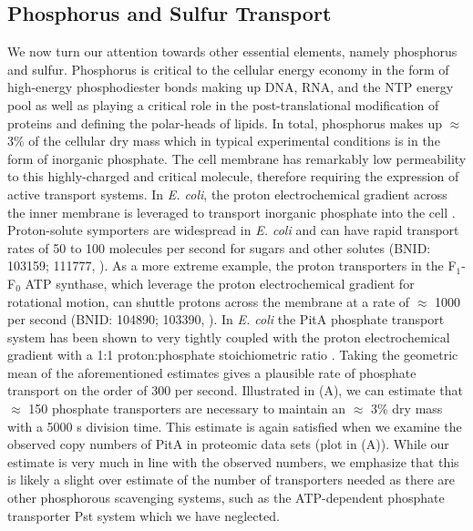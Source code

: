 \subsection{Phosphorus and Sulfur Transport}
We now turn our attention towards other essential elements, namely phosphorus and
sulfur. Phosphorus is critical to the cellular energy economy in the form of
high-energy phosphodiester bonds making up DNA, RNA, and the NTP energy pool as
well as playing a critical role in the post-translational modification of
proteins and defining the polar-heads of lipids. In total, phosphorus
makes up $\approx$3\% of the cellular dry mass which in typical experimental conditions is in the form of inorganic phosphate. The cell membrane
has remarkably low permeability to this highly-charged and critical molecule,
therefore requiring the expression of active transport systems. In \textit{E. coli}, the proton
electrochemical gradient across the inner membrane is leveraged to transport
inorganic phosphate into the cell \citep{rosenberg1977}.
Proton-solute symporters are widespread in \textit{E. coli} \citep{ramos1977,
booth1979} and can have rapid transport rates of 50 to 100 molecules per second for
sugars and other solutes (BNID: 103159; 111777, \cite{milo2010}). As a more
extreme example, the proton transporters in the F$_1$-F$_0$ ATP synthase, which
leverage the proton electrochemical gradient for rotational motion, can shuttle
protons across the membrane at a rate of $\approx$ 1000 per second (BNID:
104890; 103390, \citep{milo2010}). In \textit{E.
coli} the PitA phosphate transport system has been shown to very tightly coupled
with the proton electrochemical gradient with a 1:1 proton:phosphate
stoichiometric ratio \citep{harris2001, feist2007}. Taking the geometric mean of
the aforementioned estimates gives a plausible rate of phosphate transport on
the order of 300  per second. Illustrated in
(A), we can estimate that $\approx$ 150
phosphate transporters are necessary to maintain an $\approx$ 3\% dry mass with
a 5000 s division time. This estimate is again satisfied when we examine the
observed copy numbers of PitA in proteomic data sets (plot in
(A)). While our estimate is very much in line with the
observed numbers, we emphasize that this is likely a slight over estimate of the
number of transporters needed as there are other phosphorous scavenging systems,
such as the ATP-dependent phosphate transporter Pst system which we have neglected.

